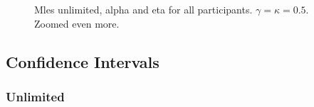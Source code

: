 \begin{figure}
\begin{minipage}{0.48\textwidth}
        \caption{Mles unlimited, alpha and eta for all participants. $\gamma=\kappa=0.5$. Zoomed even more.}
        \label{fig:gk0.5_mles_unlimited_zoomed2}
    \end{minipage}
\end{figure}




\subsection{Confidence Intervals}


\subsubsection{Unlimited}
